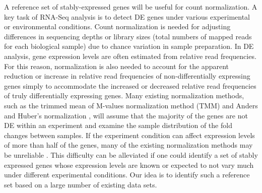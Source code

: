 \documentclass[letterpaper,12pt]{article}
\begin{document}
A reference set of stably-expressed genes will be useful for count
normalization.  A key task of RNA-Seq analysis is to detect DE genes under
various experimental or environmental conditions. Count normalization is
needed for adjusting differences in sequencing depths or library sizes (total
numbers of mapped reads for each biological sample) due to chance variation in
sample preparation.  In DE analysis, gene expression levels are often
estimated from relative read frequencies. For this reason, normalization is
also needed to account for the apparent reduction or increase in relative read
frequencies of non-differentially expressing genes simply to accommodate the
increased or decreased relative read frequencies of truly differentially
expressing genes.  Many existing normalization methods, such as the trimmed
mean of M-values normalization method (TMM) \citep{robinson2010scaling} and
Anders and Huber's normalization \citep{anders2010differential}, will  assume that the
majority of the genes are not DE within an experiment and examine the sample
distribution of the fold changes between samples.
If the experiment condition can affect expression levels of more than half of
the genes, many of the existing normalization methods may be unreliable
\citep{loven2012revisiting, wu2013use}.  This difficulty can be
alleviated if one could identify a set of stably expressed genes whose
expression levels are known or expected to not vary much under different
experimental conditions. Our idea is to identify such a reference set based on
a large number of existing data sets.
\end{document}
